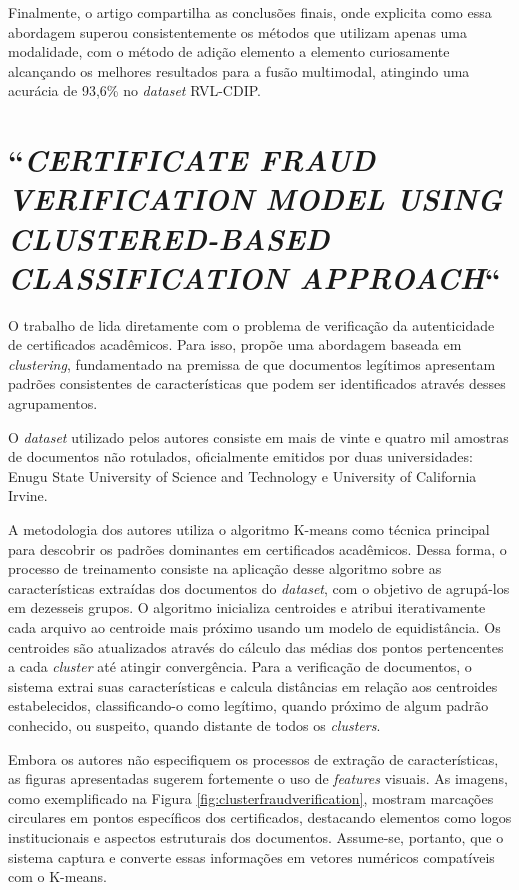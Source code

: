 Finalmente, o artigo compartilha as conclusões finais, onde explicita como essa abordagem superou consistentemente os métodos que utilizam apenas uma modalidade, com o método de adição elemento a elemento curiosamente alcançando os melhores resultados para a fusão multimodal, atingindo uma acurácia de 93,6\% no \textit{dataset} RVL-CDIP.

\section{``\protect\textit{CERTIFICATE FRAUD VERIFICATION MODEL USING CLUSTERED-BASED CLASSIFICATION APPROACH}``}

O trabalho de \citeauthor*{clusterfraudverification} \cite*{clusterfraudverification} lida diretamente com o problema de verificação da autenticidade de certificados acadêmicos. Para isso, propõe uma abordagem baseada em \textit{clustering}, fundamentado na premissa de que documentos legítimos apresentam padrões consistentes de características que podem ser identificados através desses agrupamentos.

O \textit{dataset} utilizado pelos autores consiste em mais de vinte e quatro mil amostras de documentos não rotulados, oficialmente emitidos por duas universidades: Enugu State University of Science and Technology e University of California Irvine.

A metodologia dos autores utiliza o algoritmo K-means como técnica principal para descobrir os padrões dominantes em certificados acadêmicos. Dessa forma, o processo de treinamento consiste na aplicação desse algoritmo sobre as características extraídas dos documentos do \textit{dataset}, com o objetivo de agrupá-los em dezesseis grupos. O algoritmo inicializa centroides e atribui iterativamente cada arquivo ao centroide mais próximo usando um modelo de equidistância. Os centroides são atualizados através do cálculo das médias dos pontos pertencentes a cada \textit{cluster} até atingir convergência. Para a verificação de documentos, o sistema extrai suas características e calcula distâncias em relação aos centroides estabelecidos, classificando-o como legítimo, quando próximo de algum padrão conhecido, ou suspeito, quando distante de todos os \textit{clusters}.

Embora os autores não especifiquem os processos de extração de características, as figuras apresentadas sugerem fortemente o uso de \textit{features} visuais. As imagens, como exemplificado na Figura \ref{fig:clusterfraudverification}, mostram marcações circulares em pontos específicos dos certificados, destacando elementos como logos institucionais e aspectos estruturais dos documentos. Assume-se, portanto, que o sistema captura e converte essas informações em vetores numéricos compatíveis com o K-means.

